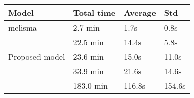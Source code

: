 \begin{tabular}{l|lll}
    Model                        & Total time & Average & Std    \\
    \hline
    \gls{melisma}                & 2.7 min    & 1.7s    & 0.8s   \\
    \textcite{chen2021attend}    & 22.5 min   & 14.4s   & 5.8s   \\
    Proposed model               & 23.6 min   & 15.0s   & 11.0s  \\
    \textcite{micchi2021deep}    & 33.9 min   & 21.6s   & 14.6s  \\
    \textcite{mcleod2021modular} & 183.0 min  & 116.8s  & 154.6s \\
\end{tabular}
